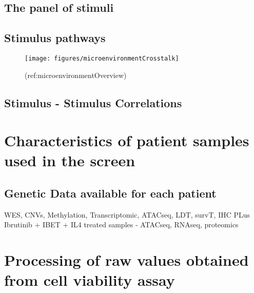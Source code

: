 \documentclass[11pt, a4paper, twosided]{book}
\begin{document}
\hypertarget{stimuli-info}{%
\subsection{The panel of stimuli}\label{stimuli-info}}

\hypertarget{stimulus-pathways}{%
\subsection{Stimulus pathways}\label{stimulus-pathways}}


\begin{figure}

{\centering \texttt{[image: figures/microenvironmentCrosstalk]} 

}

\caption{(ref:microenvironmentOverview)}\label{fig:microenvironmentCrosstalk}
\end{figure}
\hypertarget{stimulus---stimulus-correlations}{%
\subsection{Stimulus - Stimulus Correlations}\label{stimulus---stimulus-correlations}}

\hypertarget{characteristics-of-patient-samples-used-in-the-screen}{%
\section{Characteristics of patient samples used in the screen}\label{characteristics-of-patient-samples-used-in-the-screen}}

\hypertarget{genetic-data-available-for-each-patient}{%
\subsection{Genetic Data available for each patient}\label{genetic-data-available-for-each-patient}}

WES, CNVs, Methylation, Transcriptomic, ATACseq, LDT, survT, IHC
PLus Ibrutinib + IBET + IL4 treated samples - ATACseq, RNAseq, proteomics

\hypertarget{processing-of-raw-values-obtained-from-cell-viability-assay}{%
\section{Processing of raw values obtained from cell viability assay}\label{processing-of-raw-values-obtained-from-cell-viability-assay}}
\end{document}
